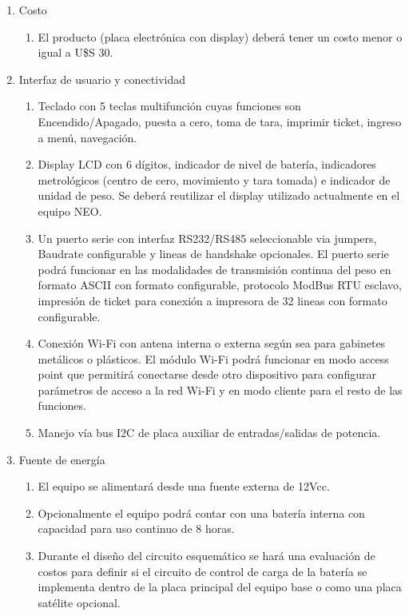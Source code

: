 \documentclass[11pt]{charter}
\begin{document}
\begin{enumerate}
\item Costo
	\begin{enumerate}
	\item El producto (placa electrónica con display) deberá tener un costo menor o igual a U\$S 30. %
	\end{enumerate}
\item Interfaz de usuario y conectividad
	\begin{enumerate}
	\item Teclado con 5 teclas multifunción cuyas funciones son Encendido/Apagado, puesta a cero, toma de tara, imprimir ticket, ingreso a menú, navegación.
	\item Display LCD con 6 dígitos, indicador de nivel de batería, indicadores metrológicos (centro de cero, movimiento y tara tomada) e indicador de unidad de peso. Se deberá reutilizar el display utilizado actualmente en el equipo NEO.
	\item Un puerto serie con interfaz RS232/RS485 seleccionable via jumpers, Baudrate configurable y lineas de handshake opcionales. El puerto serie podrá funcionar en las modalidades de transmisión continua del peso en formato ASCII con formato configurable, protocolo ModBus RTU esclavo, impresión de ticket para conexión a impresora de 32 lineas con formato configurable. 
	\item Conexión Wi-Fi con antena interna o externa según sea para gabinetes metálicos o plásticos. El módulo Wi-Fi podrá funcionar en modo access point que permitirá conectarse desde otro dispositivo para configurar parámetros de acceso a la red Wi-Fi y en modo cliente para el resto de las funciones.
	\item Manejo vía bus I2C de placa auxiliar de entradas/salidas de potencia.
	\end{enumerate}
\item Fuente de energía
	\begin{enumerate}
	\item El equipo se alimentará desde una fuente externa de 12Vcc.
	\item Opcionalmente el equipo podrá contar con una batería interna con capacidad para uso continuo de 8 horas.
	\item Durante el diseño del circuito esquemático se hará una evaluación de costos para definir si el circuito de control de carga de la batería se implementa dentro de la placa principal del equipo base o como una placa satélite opcional. 

\end{enumerate}
\end{enumerate}
\end{document}
